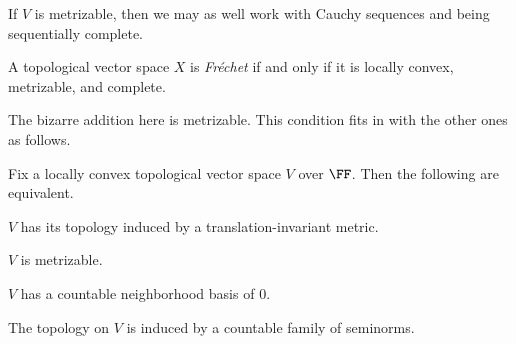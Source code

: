 \documentclass[notes.tex]{subfiles}
\begin{document}
\begin{remark}
	If $V$ is metrizable, then we may as well work with Cauchy sequences and being sequentially complete.
\end{remark}
\begin{definition}[Fr\'echet]
	A topological vector space $X$ is \textit{Fr\'echet} if and only if it is locally convex, metr\-izable, and complete.
\end{definition}
The bizarre addition here is metrizable. This condition fits in with the other ones as follows.
\begin{proposition} \label{prop:locally-convex-to-metric}
	Fix a locally convex topological vector space $V$ over $\FF$. Then the following are equivalent.
	\begin{listroman}
		\item $V$ has its topology induced by a translation-invariant metric.
		\item $V$ is metrizable.
		\item $V$ has a countable neighborhood basis of $0$.
		\item The topology on $V$ is induced by a countable family of seminorms.
	\end{listroman}
\end{proposition}
\end{document}
